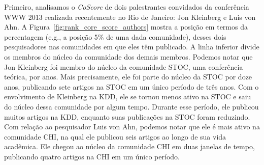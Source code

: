 Primeiro, analisamos o \textit{CoScore} de dois palestrantes convidados da 
conferência WWW 2013 realizada recentemente no Rio de Janeiro: Jon Kleinberg 
e Luis von Ahn. A Figura~\ref{fig:rank_core_score_authors} mostra 
a posição em termos da percentagem (e.g., a posição 5\% de uma dada comunidade), 
desses dois pesquisadores nas comunidades em que eles têm publicado. A linha inferior 
divide os membros do núcleo da comunidade dos demais membros. Podemos notar que Jon 
Kleinberg foi membro do núcleo da comunidade STOC, uma conferência teórica, por anos. Mais 
precisamente, ele foi parte do núcleo da STOC por doze anos, publicando sete artigos 
na STOC em um único período de três anos. Com o envolvimento de Kleinberg na KDD, ele se tornou 
menos ativo na STOC e saiu do núcleo dessa comunidade por algum tempo. Durante esse 
período, ele publicou muitos artigos na KDD, enquanto suas publicações na STOC foram 
reduzindo. Com relação ao pesquisador Luis von Ahn, podemos notar que ele é mais ativo 
na comunidade CHI, na qual ele publicou seis artigos ao longo de sua vida acadêmica. Ele 
chegou ao núcleo da comunidade CHI em duas janelas de tempo, publicando quatro artigos 
na CHI em um único período.


